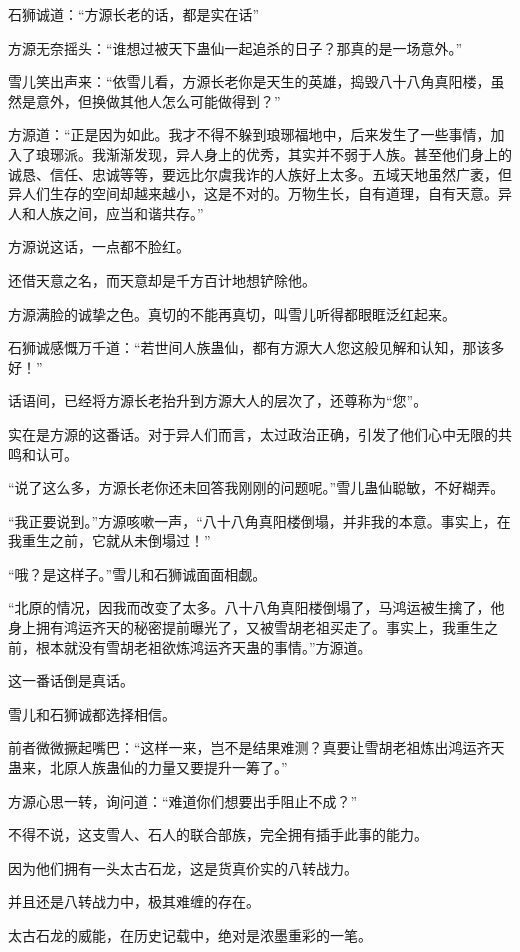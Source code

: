 \begin{this_body}
石狮诚道：“方源长老的话，都是实在话”

方源无奈摇头：“谁想过被天下蛊仙一起追杀的日子？那真的是一场意外。”

雪儿笑出声来：“依雪儿看，方源长老你是天生的英雄，捣毁八十八角真阳楼，虽然是意外，但换做其他人怎么可能做得到？”

方源道：“正是因为如此。我才不得不躲到琅琊福地中，后来发生了一些事情，加入了琅琊派。我渐渐发现，异人身上的优秀，其实并不弱于人族。甚至他们身上的诚恳、信任、忠诚等等，要远比尔虞我诈的人族好上太多。五域天地虽然广袤，但异人们生存的空间却越来越小，这是不对的。万物生长，自有道理，自有天意。异人和人族之间，应当和谐共存。”

方源说这话，一点都不脸红。

还借天意之名，而天意却是千方百计地想铲除他。

方源满脸的诚挚之色。真切的不能再真切，叫雪儿听得都眼眶泛红起来。

石狮诚感慨万千道：“若世间人族蛊仙，都有方源大人您这般见解和认知，那该多好！”

话语间，已经将方源长老抬升到方源大人的层次了，还尊称为“您”。

实在是方源的这番话。对于异人们而言，太过政治正确，引发了他们心中无限的共鸣和认可。

“说了这么多，方源长老你还未回答我刚刚的问题呢。”雪儿蛊仙聪敏，不好糊弄。

“我正要说到。”方源咳嗽一声，“八十八角真阳楼倒塌，并非我的本意。事实上，在我重生之前，它就从未倒塌过！”

“哦？是这样子。”雪儿和石狮诚面面相觑。

“北原的情况，因我而改变了太多。八十八角真阳楼倒塌了，马鸿运被生擒了，他身上拥有鸿运齐天的秘密提前曝光了，又被雪胡老祖买走了。事实上，我重生之前，根本就没有雪胡老祖欲炼鸿运齐天蛊的事情。”方源道。

这一番话倒是真话。

雪儿和石狮诚都选择相信。

前者微微撅起嘴巴：“这样一来，岂不是结果难测？真要让雪胡老祖炼出鸿运齐天蛊来，北原人族蛊仙的力量又要提升一筹了。”

方源心思一转，询问道：“难道你们想要出手阻止不成？”

不得不说，这支雪人、石人的联合部族，完全拥有插手此事的能力。

因为他们拥有一头太古石龙，这是货真价实的八转战力。

并且还是八转战力中，极其难缠的存在。

太古石龙的威能，在历史记载中，绝对是浓墨重彩的一笔。


\end{this_body}
